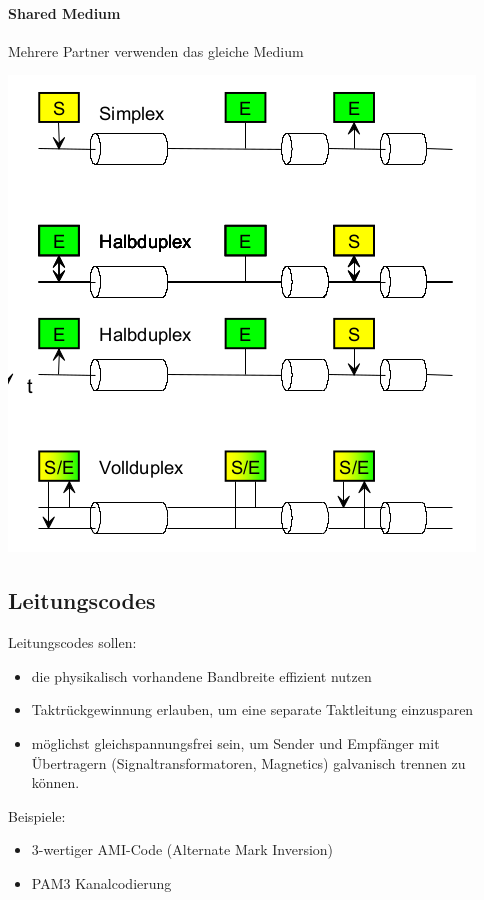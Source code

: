 \paragraph{Shared Medium }{
    {Mehrere Partner verwenden das gleiche Medium   \\}

    \includegraphics[scale=.35]{img/kopplung_2.png}

}
\vfill\null
\columnbreak
\subsection{Leitungscodes}{
    Leitungscodes sollen:

    \begin{itemize}[noitemsep]
        \item die physikalisch vorhandene Bandbreite effizient nutzen
        \item Taktrückgewinnung erlauben, um eine separate Taktleitung einzusparen
        \item möglichst gleichspannungsfrei sein, um Sender und Empfänger mit Übertragern (Signaltransformatoren, Magnetics) galvanisch trennen zu können.
    \end{itemize}

    Beispiele:
    \begin{itemize}[noitemsep]
        \item 3-wertiger AMI-Code (Alternate Mark Inversion)
        \item PAM3 Kanalcodierung
    \end{itemize}
}


